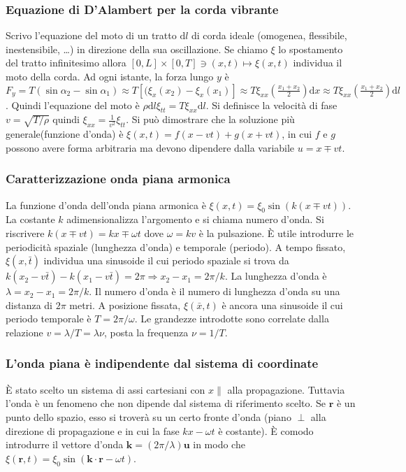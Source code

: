 \documentclass[11pt,a4paper]{article}
\newcommand{\de}{\mathrm d}
\begin{document}
\subsubsection{Equazione di D'Alambert per la corda vibrante}
Scrivo l'equazione del moto di un tratto $\de l$ di corda ideale (omogenea, flessibile, inestensibile, \ldots) in direzione della sua oscillazione. Se chiamo $\xi$ lo spostamento del tratto infinitesimo allora $[0,L] \times [0,T] \ni (x,t)  \mapsto \xi(x,t)$ individua il moto della corda. Ad ogni istante, la forza lungo $y$ è $F_y = T(\sin\alpha_2 - \sin\alpha_1) \approx T[(\xi_x(x_2) - \xi_x(x_1)] \approx T \xi_{xx}(\frac{x_1+x_2}2) \de x \approx T \xi_{xx} (\frac{x_1+x_2}2) \de l$. Quindi l'equazione del moto è $\rho \de l \xi_{tt} = T \xi_{xx} \de l$. Si definisce la velocità di fase $v = \sqrt{T/\rho}$ quindi $\xi_{xx} = \frac1{v^2} \xi_{tt}$. Si può dimostrare che la soluzione più generale(funzione d'onda) è $\xi(x,t) = f(x-vt) + g(x+vt)$, in cui $f$ e $g$ possono avere forma arbitraria ma devono dipendere dalla variabile $u=x\mp vt$.

\subsubsection{Caratterizzazione onda piana armonica}
La funzione d'onda dell'onda piana armonica è $\xi(x,t) = \xi_0 \sin(k(x \mp vt))$. La costante $k$ adimensionalizza l'argomento e si chiama numero d'onda. Si riscrivere $k(x \mp vt) = kx \mp \omega t$ dove $\omega = k v$ è la pulsazione. È utile introdurre le periodicità spaziale (lunghezza d'onda) e temporale (periodo). A tempo fissato, $\xi(x,\bar t)$ individua una sinusoide il cui periodo spaziale si trova da $k(x_2-v\bar t) - k(x_1-v\bar t) = 2\pi \Rightarrow x_2 - x_1 = 2\pi/k$. La lunghezza d'onda è $\lambda = x_2 - x_1 = 2\pi/k$. Il numero d'onda è il numero di lunghezza d'onda su una distanza di $2\pi$ metri. A posizione fissata, $\xi(\bar x,t)$ è ancora una sinusoide il cui periodo temporale è $T = 2\pi/\omega$. Le grandezze introdotte sono correlate dalla relazione $v = \lambda/T = \lambda \nu$, posta la frequenza $\nu= 1/T$.

\subsubsection{L'onda piana è indipendente dal sistema di coordinate}
È stato scelto un sistema di assi cartesiani con $x \parallel$ alla propagazione. Tuttavia l'onda è un fenomeno che non dipende dal sistema di riferimento scelto. Se $\mathbf r$ è un punto dello spazio, esso si troverà su un certo fronte d'onda (piano $\perp$ alla direzione di propagazione e in cui la fase $kx-\omega t$ è costante). È comodo introdurre il vettore d'onda $\mathbf k = (2\pi/\lambda) \mathbf u$ in modo che $\xi(\mathbf r,t) = \xi_0 \sin(\mathbf k \cdot \mathbf r - \omega t)$.
\end{document}
